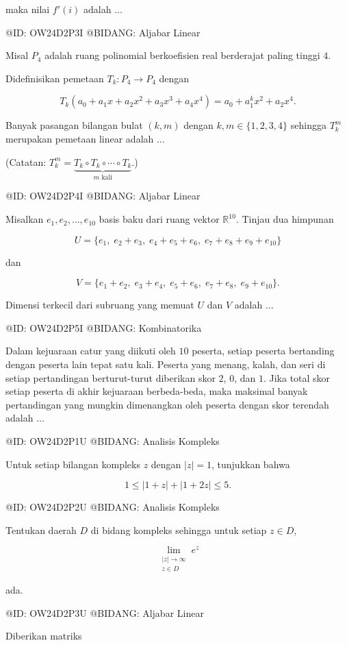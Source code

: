 maka nilai $f'(i)$ adalah $\ldots$

@ID: OW24D2P3I
@BIDANG: Aljabar Linear

Misal $P_4$ adalah ruang polinomial berkoefisien real berderajat paling tinggi $4$.

Didefinisikan pemetaan $T_k:P_4\to P_4$ dengan

$$
T_k(a_0+a_1x+a_2x^2+a_3x^3+a_4x^4)
=
a_0+a_1^kx^2+a_2x^4.
$$

Banyak pasangan bilangan bulat $(k,m)$ dengan $k,m\in\{1,2,3,4\}$ sehingga $T_k^m$ merupakan pemetaan linear adalah $\ldots$

(Catatan: $T_k^m=\underbrace{T_k\circ T_k\circ\cdots\circ T_k}_{m\text{ kali}}$.)

@ID: OW24D2P4I
@BIDANG: Aljabar Linear

Misalkan $e_1,e_2,\ldots,e_{10}$ basis baku dari ruang vektor $\mathbb R^{10}$. Tinjau dua himpunan

$$
U=\{e_1,\;e_2+e_3,\;e_4+e_5+e_6,\;e_7+e_8+e_9+e_{10}\}
$$

dan

$$
V=\{e_1+e_2,\;e_3+e_4,\;e_5+e_6,\;e_7+e_8,\;e_9+e_{10}\}.
$$

Dimensi terkecil dari subruang yang memuat $U$ dan $V$ adalah $\ldots$

@ID: OW24D2P5I
@BIDANG: Kombinatorika

Dalam kejuaraan catur yang diikuti oleh $10$ peserta, setiap peserta bertanding dengan peserta lain tepat satu kali. Peserta yang menang, kalah, dan seri di setiap pertandingan berturut-turut diberikan skor $2$, $0$, dan $1$. Jika total skor setiap peserta di akhir kejuaraan berbeda-beda, maka maksimal banyak pertandingan yang mungkin dimenangkan oleh peserta dengan skor terendah adalah $\ldots$


@ID: OW24D2P1U
@BIDANG: Analisis Kompleks

Untuk setiap bilangan kompleks $z$ dengan $|z|=1$, tunjukkan bahwa

$$
1\le |1+z|+|1+2z|\le5.
$$

@ID: OW24D2P2U
@BIDANG: Analisis Kompleks

Tentukan daerah $D$ di bidang kompleks sehingga untuk setiap $z\in D$,

$$
\lim_{\substack{|z|\to\infty\\ z\in D}}e^z
$$

ada.

@ID: OW24D2P3U
@BIDANG: Aljabar Linear

Diberikan matriks

